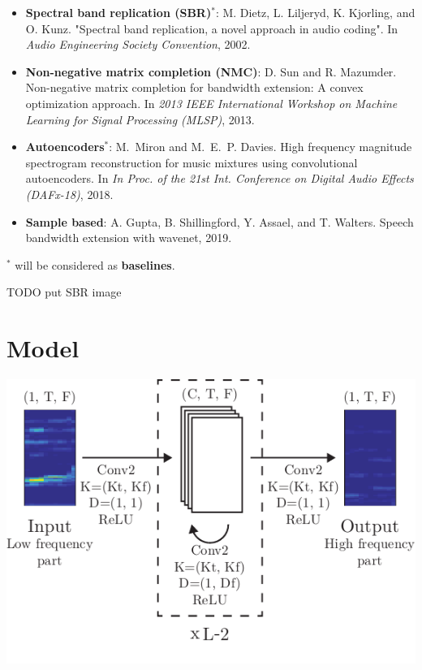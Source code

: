 \documentclass[a0,portrait,20pt]{a0poster}
\begin{document}
\begin{multicols}{2}
\begin{itemize}
  \item \textbf{Spectral band replication (SBR)$^*$}: M. Dietz, L. Liljeryd, K. Kjorling, and O. Kunz. "Spectral band replication, a novel approach in audio coding". In {\em Audio Engineering Society Convention}, 2002.
  \item \textbf{Non-negative matrix completion (NMC)}: D. Sun and R. Mazumder. Non-negative matrix completion for bandwidth extension: A convex optimization approach. In {\em 2013 IEEE International Workshop on Machine Learning for Signal Processing (MLSP)}, 2013.
  \item \textbf{Autoencoders$^*$}: M.~Miron and M.~E.~P. Davies. High frequency magnitude spectrogram reconstruction for music
    mixtures using convolutional autoencoders. In {\em In Proc. of the 21st Int. Conference on Digital Audio Effects
    (DAFx-18)}, 2018.
  \item \textbf{Sample based}: A. Gupta, B. Shillingford, Y. Assael, and T. Walters. Speech bandwidth extension with wavenet, 2019.
\end{itemize}
$^*$ will be considered as \textbf{baselines}.

TODO put SBR image

\color{DarkSlateGray}

\section*{Model}

\begin{center}\vspace{1cm}
\includegraphics[width=.6\linewidth]{mdl}
\end{center}\vspace{1cm}


\end{multicols}
\end{document}
